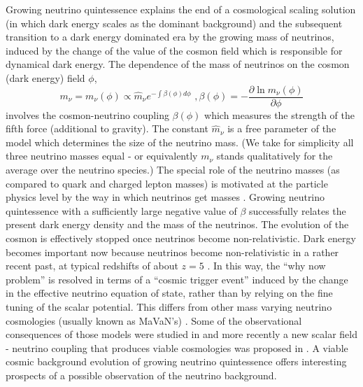 Growing neutrino quintessence \cite{amendola_growing_2008,wetterich_growing_2007}
explains the end of a cosmological scaling solution (in which dark
energy scales as the dominant background) and the subsequent transition
to a dark energy dominated era by the growing mass of neutrinos, induced
by the change of the value of the cosmon field which is responsible
for dynamical dark energy. The dependence of the mass of neutrinos
on the cosmon (dark energy) field $\phi$, 
\begin{equation}
m_{\nu}=m_{\nu}(\phi)\propto\hat{m}_{\nu}e^{-\int\beta(\phi)d\phi}\,\,,\beta(\phi)=-\frac{\partial\ln m_{\nu}(\phi)}{\partial\phi}\label{eq: mass_def}
\end{equation}
involves the cosmon-neutrino coupling $\beta(\phi)$ which measures
the strength of the fifth force (additional to gravity). The constant
$\hat{m}_{\nu}$ is a free parameter of the model which determines
the size of the neutrino mass. (We take for simplicity all three neutrino
masses equal - or equivalently $m_{\nu}$ stands qualitatively for
the average over the neutrino species.) The special role of the neutrino
masses (as compared to quark and charged lepton masses) is motivated
at the particle physics level by the way in which neutrinos get masses
\cite{wetterich_growing_2007}. Growing neutrino quintessence with
a sufficiently large negative value of $\beta$ successfully relates
the present dark energy density and the mass of the neutrinos. The
evolution of the cosmon is effectively stopped once neutrinos become
non-relativistic. Dark energy becomes important now because neutrinos
become non-relativistic in a rather recent past, at typical redshifts
of about $z=5$ \cite{mota_neutrino_2008}. In this way, the ``why
now problem'' is resolved in terms of a ``cosmic trigger event''
induced by the change in the effective neutrino equation of state,
rather than by relying on the fine tuning of the scalar potential.
This differs from other mass varying neutrino cosmologies (usually
known as MaVaN's) \cite{brookfield_cosmology_2007,la_vacca_mass-varying_2013,bi_cosmological_2005,fardon_dark_2004,kaplan_neutrino_2004,spitzer_stability_2006,takahashi_speed_2006}.
Some of the observational consequences of those models were studied
in \cite{la_vacca_mass-varying_2013,kaplan_neutrino_2004} and more
recently a new scalar field - neutrino coupling that produces viable
cosmologies was proposed in \cite{simpson_dark_2016}. A viable cosmic
background evolution of growing neutrino quintessence offers interesting
prospects of a possible observation of the neutrino background.

